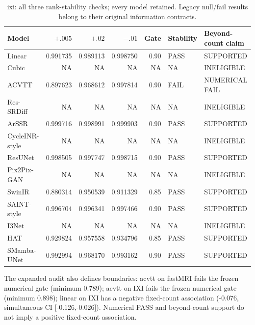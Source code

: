 \begin{table}[t]\centering\scriptsize

\caption{ixi: all three rank-stability checks; every model retained. Legacy null/fail results belong to their original information contracts.}

\begin{tabular}{lrrrrll}\toprule Model & $+.005$ & $+.02$ & $-.01$ & Gate & Stability & Beyond-count claim\\\midrule

Linear & 0.991735 & 0.989113 & 0.998750 & 0.90 & PASS & SUPPORTED\\

Cubic & NA & NA & NA & NA & NA & INELIGIBLE\\

ACVTT & 0.897623 & 0.968612 & 0.997814 & 0.90 & FAIL & NUMERICAL FAIL\\

Res-SRDiff & NA & NA & NA & NA & NA & INELIGIBLE\\

ArSSR & 0.999716 & 0.998991 & 0.999903 & 0.90 & PASS & SUPPORTED\\

CycleINR-style & NA & NA & NA & NA & NA & INELIGIBLE\\

ResUNet & 0.998505 & 0.997747 & 0.998715 & 0.90 & PASS & SUPPORTED\\

Pix2Pix-GAN & NA & NA & NA & NA & NA & INELIGIBLE\\

SwinIR & 0.880314 & 0.950539 & 0.911329 & 0.85 & PASS & SUPPORTED\\

SAINT-style & 0.996704 & 0.996341 & 0.997466 & 0.90 & PASS & SUPPORTED\\

I3Net & NA & NA & NA & NA & NA & INELIGIBLE\\

HAT & 0.929824 & 0.957558 & 0.934796 & 0.85 & PASS & SUPPORTED\\

SMamba-UNet & 0.992994 & 0.968170 & 0.993162 & 0.90 & PASS & SUPPORTED\\

\bottomrule\end{tabular}\end{table}

The expanded audit also defines boundaries: acvtt on fastMRI fails the frozen numerical gate (minimum 0.789); acvtt on IXI fails the frozen numerical gate (minimum 0.898); linear on IXI has a negative fixed-count association (-0.076, simultaneous CI [-0.126,-0.026]). Numerical PASS and beyond-count support do not imply a positive fixed-count association.

